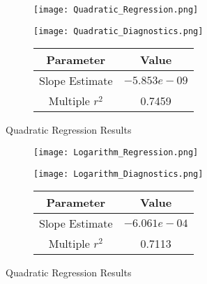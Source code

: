 \documentclass{article}
\begin{document}
\begin{figure}[p] %
    \centering
    \begin{subfigure}{0.49\textwidth}
        \centering
        \texttt{[image: Quadratic\_Regression.png]}
    \end{subfigure}
    \begin{subfigure}{0.49\textwidth}
        \centering
        \texttt{[image: Quadratic\_Diagnostics.png]}
    \end{subfigure}
    \begin{subfigure}{\textwidth}
        \centering
        \vspace{0.5cm}
        \begin{tabular}{|c|c|}
        \hline
        Parameter & Value \\ \hline \hline
        Slope Estimate & $-5.853e-09$ \\ \hline
        Multiple $r^2$ & 0.7459 \\ \hline
        \end{tabular}
    \end{subfigure}
    \caption{Quadratic Regression Results}
\end{figure}
\begin{figure}[p] %
    \centering
    \begin{subfigure}{0.49\textwidth}
        \centering
        \texttt{[image: Logarithm\_Regression.png]}
    \end{subfigure}
    \begin{subfigure}{0.49\textwidth}
        \centering
        \texttt{[image: Logarithm\_Diagnostics.png]}
    \end{subfigure}
    \begin{subfigure}{\textwidth}
        \centering
        \vspace{0.5cm}
        \begin{tabular}{|c|c|}
        \hline
        Parameter & Value \\ \hline \hline
        Slope Estimate & $-6.061e-04$ \\ \hline
        Multiple $r^2$ & 0.7113 \\ \hline
        \end{tabular}
    \end{subfigure}
    \caption{Quadratic Regression Results}
\end{figure}
\end{document}
